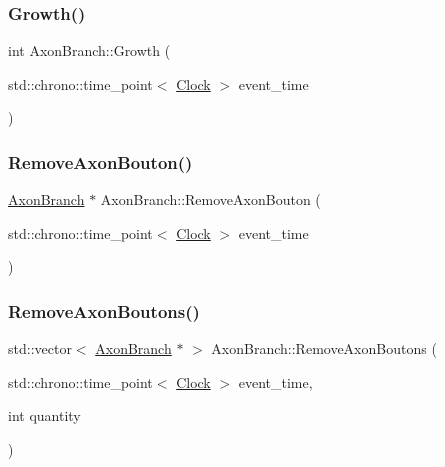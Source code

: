 \mbox{\label{classAxonBranch_a6e434a57873ab0fdbc72cf7ecc7228ed}} 
\subsubsection{\texorpdfstring{Growth()}{Growth()}}
{\footnotesize\ttfamily int Axon\+Branch\+::\+Growth (\begin{DoxyParamCaption}\item[{std\+::chrono\+::time\+\_\+point$<$ \mbox{\hyperlink{universe_8h_a0ef8d951d1ca5ab3cfaf7ab4c7a6fd80}{Clock}} $>$}]{event\+\_\+time }\end{DoxyParamCaption})}

\mbox{\label{classAxonBranch_a06753a2a61941a59d86510e51ba44b15}} 
\subsubsection{\texorpdfstring{Remove\+Axon\+Bouton()}{RemoveAxonBouton()}}
{\footnotesize\ttfamily \mbox{\hyperlink{classAxonBranch}{Axon\+Branch}} $\ast$ Axon\+Branch\+::\+Remove\+Axon\+Bouton (\begin{DoxyParamCaption}\item[{std\+::chrono\+::time\+\_\+point$<$ \mbox{\hyperlink{universe_8h_a0ef8d951d1ca5ab3cfaf7ab4c7a6fd80}{Clock}} $>$}]{event\+\_\+time }\end{DoxyParamCaption})}

\mbox{\label{classAxonBranch_a815e055e37f89fb2627b250c5b95d406}} 
\subsubsection{\texorpdfstring{Remove\+Axon\+Boutons()}{RemoveAxonBoutons()}}
{\footnotesize\ttfamily std\+::vector$<$ \mbox{\hyperlink{classAxonBranch}{Axon\+Branch}} $\ast$ $>$ Axon\+Branch\+::\+Remove\+Axon\+Boutons (\begin{DoxyParamCaption}\item[{std\+::chrono\+::time\+\_\+point$<$ \mbox{\hyperlink{universe_8h_a0ef8d951d1ca5ab3cfaf7ab4c7a6fd80}{Clock}} $>$}]{event\+\_\+time,  }\item[{int}]{quantity }\end{DoxyParamCaption})}

